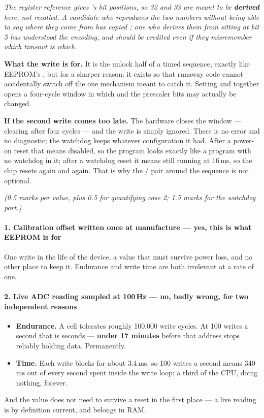 {\itshape The register reference gives 's bit positions, so 32 and 33 are meant to be
\textbf{derived} here, not recalled. A candidate who reproduces the two numbers without being able
to say where they come from has copied ; one who derives them from 
sitting at bit 5 has understood the encoding, and should be credited even if they misremember which
timeout is which.\par}

\medskip \textbf{What the  write is for.} It is the unlock half of a timed sequence,
exactly like EEPROM's , but for a sharper reason: it exists so that runaway code cannot
accidentally switch off the one mechanism meant to catch it. Setting  and 
together opens a four-cycle window in which  and the prescaler bits may actually be
changed. 

\textbf{If the second write comes too late.} The hardware closes the window --- clearing 
after four cycles --- and the write is simply ignored. There is no error and no diagnostic; the
watchdog keeps whatever configuration it had. After a power-on reset that means disabled, so the
program looks exactly like a program with no watchdog in it; after a watchdog reset it means still
running at 16\,ms, so the chip resets again and again. That is why the /
pair around the sequence is not optional. 

{\itshape (0.5 marks per value, plus 0.5 for quantifying case 2; 1.5 marks for the watchdog
part.)\par}

\paragraph{1. Calibration offset written once at manufacture --- yes, this is what EEPROM is for}
One write in the life of the device, a value that must survive power loss, and no other place to
keep it. Endurance and write time are both irrelevant at a rate of one.

\paragraph{2. Live ADC reading sampled at 100\,Hz --- no, badly wrong, for two independent reasons}
\begin{itemize}
  \item \textbf{Endurance.} A cell tolerates roughly 100,000 write cycles. At 100 writes a second
    that is  seconds --- \textbf{under 17 minutes} before that address
    stops reliably holding data. Permanently.
  \item \textbf{Time.} Each write blocks for about 3.4\,ms, so 100 writes a second means 340\,ms
    out of every second spent inside the write loop: a third of the CPU, doing nothing, forever.
\end{itemize}
And the value does not need to survive a reset in the first place --- a live reading is by
definition current, and belongs in RAM.

